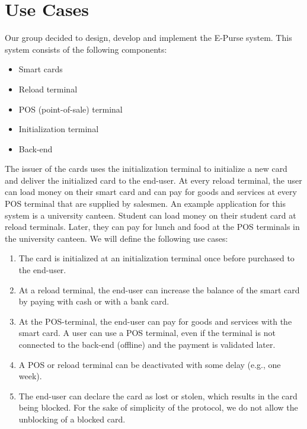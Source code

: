 


\maketitle



\section{Use Cases}
Our group decided to design, develop and implement the E-Purse system. This system consists of the following components:
\begin{itemize}
    \item Smart cards
    \item Reload terminal
    \item POS (point-of-sale) terminal
    \item Initialization terminal
    \item Back-end
\end{itemize}
The issuer of the cards uses the initialization terminal to initialize a new card and deliver the initialized card to the end-user. At every reload terminal, the user can load money on their smart card and can pay for goods and services at every POS terminal that are supplied by salesmen. An example application for this system is a university canteen. Student can load money on their student card at reload terminals. Later, they can pay for lunch and food at the POS terminals in the university canteen.
We will define the following use cases:
\begin{enumerate}[label={UC\arabic*:}, ref={UC\arabic*}, leftmargin=3\parindent]
    \item \label{uc:person} The card is initialized at an initialization terminal once before purchased to the end-user.
    
    \item \label{uc:reload} At a reload terminal, the end-user can increase the balance of the smart card by paying with cash or with a bank card.
    
    \item \label{uc:payment} At the POS-terminal, the end-user can pay for goods and services with the smart card. A user can use a POS terminal, even if the terminal is not connected to the back-end (offline) and the payment is validated later.

    \item A POS or reload terminal can be deactivated with some delay (e.g., one week).
    
    \item The end-user can declare the card as lost or stolen, which results in the card being blocked.
    For the sake of simplicity of the protocol, we do not allow the unblocking of a blocked card.
    
\end{enumerate}
